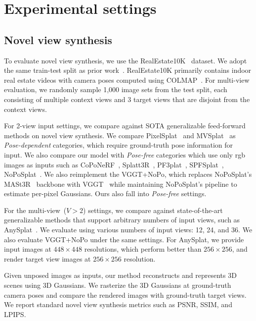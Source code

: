 \section{Experimental settings}
\label{sec:settings}
\subsection{Novel view synthesis}
To evaluate novel view synthesis, we use the RealEstate10K~\cite{zhou2018stereo} dataset. We adopt the same train-test split as prior work~\cite{charatan2024pixelsplat, chen2024mvsplat, ye2024no}. RealEstate10K primarily contains indoor real estate videos with camera poses computed using COLMAP~\cite{schonberger2016structure}. For multi-view evaluation, we randomly sample 1,000 image sets from the test split, each consisting of multiple context views and 3 target views that are disjoint from the context views.

For 2-view input settings, we compare against SOTA generalizable feed-forward methods on novel view synthesis. We compare PixelSplat~\cite{charatan2024pixelsplat} and MVSplat~\cite{chen2024mvsplat} as \textit{Pose-dependent} categories, which require ground-truth pose information for input. We also compare our model with \textit{Pose-free} categories which use only rgb images as inputs such as CoPoNeRF~\cite{hong2024unifying}, Splatt3R~\cite{smart2024splatt3r}, PF3plat~\cite{hong2024pf3plat}, SPFSplat~\cite{huang2025no}, NoPoSplat~\cite{ye2024no}. We also reimplement the VGGT+NoPo, which replaces NoPoSplat’s MASt3R~\cite{leroy2024grounding} backbone with VGGT~\cite{wang2025vggt} while maintaining NoPoSplat’s pipeline to estimate per-pixel Gaussians. Ours also fall into \textit{Pose-free} settings.

For the multi-view~($V>2$) settings, we compare against state-of-the-art generalizable methods that support arbitrary numbers of input views, such as AnySplat~\cite{jiang2025anysplat}. We evaluate using various numbers of input views: 12, 24, and 36. We also evaluate VGGT+NoPo under the same settings. For AnySplat, we provide input images at $448\times448$ resolutions, which perform better than $256 \times 256$, and render target view images at $256 \times 256$ resolution.

Given unposed images as inputs, our method reconstructs and represents 3D scenes using 3D Gaussians. We rasterize the 3D Gaussians at ground-truth camera poses and compare the rendered images with ground-truth target views. We report standard novel view synthesis metrics such as PSNR, SSIM, and LPIPS.

